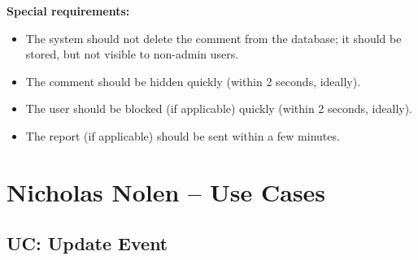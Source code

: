 \documentclass[11pt]{report}
\begin{document}
{\bfseries Special requirements:}
\begin{itemize}
	\item The system should not delete the comment from the database; it should be stored, but not visible to non-admin users.
	\item The comment should be hidden quickly (within 2 seconds, ideally).
	\item The user should be blocked (if applicable) quickly (within 2 seconds, ideally).
	\item The report (if applicable) should be sent within a few minutes.
\end{itemize}


\section{{Nicholas Nolen} -- Use Cases}

\subsection{UC: Update Event}
\end{document}
